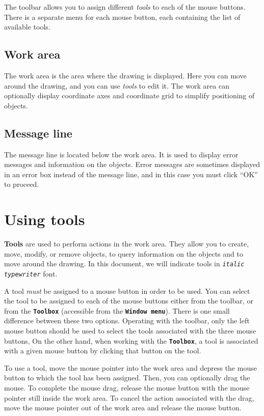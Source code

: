 \documentclass[12pt]{report}
\begin{document}
The toolbar allows you to assign different \textit{tools} to each of
the mouse buttons. There is a separate menu for each
mouse button, each containing 
the list of available tools.

\subsection{Work area}

The work area is the area where the drawing is displayed. Here you can
move around the drawing, and you can use \textit{tools} to edit it. The
work area can optionally display coordinate axes and coordinate grid
to simplify positioning of objects.

\subsection{Message line }

The message line is located below the work area. It is used to display
error messages and information on the objects. Error messages are
sometimes displayed in an error box instead of the message line, and in
this case you must click ``OK'' to proceed.

\section{Using tools}

\textbf{Tools} are used to perform actions in the work area. They
allow you to create, move, modify, or remove objects, to query
information on the objects and to move around the drawing.
In this document, we will indicate tools in \textit{\texttt{italic
typewriter}} font.

A tool \textit{must} be assigned to a mouse button in order to be used. You can
select the tool to be assigned to each of the mouse buttons either from
the toolbar, or from the \textbf{\texttt{Toolbox}} (accessible from
the \textbf{\texttt{Window menu}}). There is one small
difference between these two options. Operating with the toolbar, 
only the left mouse button should be used to select the tools associated
with the three mouse buttons,
On the other hand, when working with the \textbf{\texttt{Toolbox}}, 
a tool is associated
with a given mouse button by clicking that button on the tool. 

To use a tool, move the mouse pointer into the work area and depress
the mouse button to which the tool has been assigned. Then, you can
optionally drag the mouse. To complete the mouse drag, release the mouse button
with the mouse pointer still inside the work area. To cancel the
action associated with the drag, 
move the mouse pointer out of the work area and release the
mouse button.
\end{document}
